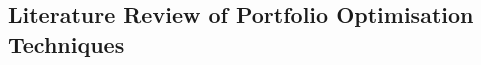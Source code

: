 \documentclass[a4paper,12pt]{report}
\numberwithin{equation}{section}
\theoremstyle{definition}
\begin{document}
\begin{landscape}
\titlespacing{\chapter}{53pt}{-70pt}{1cm}%
\chapter{Literature Review of Portfolio Optimisation Techniques}

\def\fillandplacepagenumber{%
 \par\pagestyle{empty}%
 \vbox to 0pt{\vss}\vfill
 \vbox to 0pt{\baselineskip0pt
   \hbox to\linewidth{\hss}%
   \baselineskip\footskip
   \hbox to\linewidth{%
     \hfil\thepage\hfil}\vss}}


  
  \titlespacing{\section}{0pt}{-150pt}{0cm}%

\end{landscape}
\end{document}
